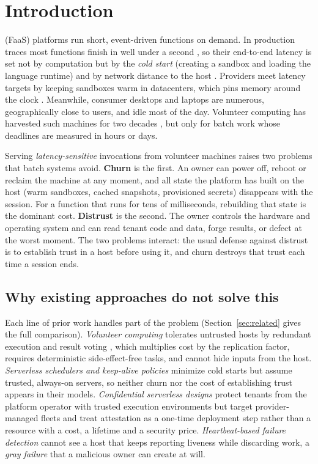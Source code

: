 \section{Introduction}
\label{sec:intro}

 (FaaS) platforms run short, event-driven functions on demand. In production traces
most functions finish in well under a second \cite{shahrad2020wild}, so their end-to-end latency is set not by computation
but by the \emph{cold start} (creating a sandbox and loading the language runtime) and by network distance to the host
\cite{agache2020firecracker,oakes2018sock,ao2022faasnap}. Providers meet latency targets by keeping sandboxes warm in
datacenters, which pins memory around the clock \cite{shahrad2020wild,fuerst2021faascache}. Meanwhile, consumer desktops and
laptops are numerous, geographically close to users, and idle most of the day. Volunteer computing has harvested such
machines for two decades \cite{anderson2002seti,anderson2004boinc}, but only for batch work whose deadlines are measured in
hours or days.

Serving \emph{latency-sensitive} invocations from volunteer machines raises two problems that batch systems avoid.
\textbf{Churn} is the first. An owner can power off, reboot or reclaim the machine at any moment, and all state the
platform has built on the host (warm sandboxes, cached snapshots, provisioned secrets) disappears with the session. For a
function that runs for tens of milliseconds, rebuilding that state is the dominant cost. \textbf{Distrust} is the
second. The owner controls the hardware and operating system and can read tenant code and data, forge results, or
defect at the worst moment. The two problems interact: the usual defense against distrust is to establish trust in a
host before using it, and churn destroys that trust each time a session ends.

\subsection{Why existing approaches do not solve this}
Each line of prior work handles part of the problem (Section~\ref{sec:related} gives the full comparison).
\emph{Volunteer computing} tolerates untrusted hosts by redundant execution and result voting \cite{anderson2004boinc}, which
multiplies cost by the replication factor, requires deterministic side-effect-free tasks, and cannot hide inputs from the
host. \emph{Serverless schedulers and keep-alive policies} minimize cold starts \cite{shahrad2020wild,fuerst2021faascache}
but assume trusted, always-on servers, so neither churn nor the cost of establishing trust appears in their models.
\emph{Confidential serverless designs} protect tenants from the platform operator with trusted execution environments
\cite{arnautov2016scone,wallet2025} but target provider-managed fleets and treat attestation as a one-time deployment step
rather than a resource with a cost, a lifetime and a security price. \emph{Heartbeat-based failure detection} cannot see a
host that keeps reporting liveness while discarding work, a \emph{gray failure} \cite{huang2017gray} that a malicious owner
can create at will.

